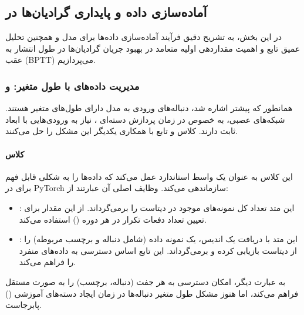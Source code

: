 \documentclass{article}
\begin{document}
\subsection{آماده‌سازی داده و پایداری گرادیان‌ها در }

در این بخش، به تشریح دقیق فرآیند آماده‌سازی داده‌ها برای مدل  و همچنین تحلیل عمیق تابع  و اهمیت مقداردهی اولیه متعامد در بهبود جریان گرادیان‌ها در طول انتشار به عقب (BPTT) می‌پردازیم.

\subsubsection{مدیریت داده‌های با طول متغیر:  و }

همانطور که پیشتر اشاره شد، دنباله‌های ورودی به مدل دارای طول‌های متغیر هستند. شبکه‌های عصبی، به خصوص در زمان پردازش دسته‌ای ، نیاز به ورودی‌هایی با ابعاد ثابت دارند. کلاس  و تابع  با همکاری یکدیگر این مشکل را حل می‌کنند.

\paragraph{کلاس }
این کلاس به عنوان یک واسط استاندارد عمل می‌کند که داده‌ها را به شکلی قابل فهم برای  در PyTorch سازماندهی می‌کند. وظایف اصلی آن عبارتند از:
\begin{itemize}
	\item {}: این متد تعداد کل نمونه‌های موجود در دیتاست را برمی‌گرداند.  از این مقدار برای تعیین تعداد دفعات تکرار در هر دوره () استفاده می‌کند.
	\item {}: این متد با دریافت یک اندیس، یک نمونه داده (شامل دنباله و برچسب مربوطه) را از دیتاست بازیابی کرده و برمی‌گرداند. این تابع اساس دسترسی به داده‌های منفرد را فراهم می‌کند.
\end{itemize}
به عبارت دیگر،  امکان دسترسی به هر جفت (دنباله، برچسب) را به صورت مستقل فراهم می‌کند، اما هنوز مشکل طول متغیر دنباله‌ها در زمان ایجاد دسته‌های آموزشی () پابرجاست.
\end{document}
